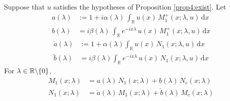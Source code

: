 \documentclass[../dissertation.tex]{subfiles}
\begin{document}
\begin{prop}\label{prop4:SD}
	Suppose that $u$ satisfies the hypotheses of Proposition \ref{prop4:exist}.
	Let
	\begin{subequations}
		\label{eq4:SD}
		\begin{align}
			a(\lambda)
				&:= 1 + i \alpha(\lambda) \,
					\int_{\mathbb R} u(x) \, M_1^+(x; \lambda, u) \, \mathrm{d}x \\
			b(\lambda)
				&= i \beta(\lambda) \, 
					\int_{\mathbb R} e^{-ix\lambda} \, u(x) \, M_1^+(x; \lambda, u) \, \mathrm{d}x
		\end{align}
	\end{subequations}
	\vspace{-\baselineskip}
	\begin{subequations}
		\label{eq4:SDbrev}
		\begin{align}
			\breve{a}(\lambda)
				&:= 1 + \alpha(\lambda)
					\int_{\mathbb R} u(x) \, N_1(x; \lambda, u) \, \mathrm{d}x \\
			\breve{b}(\lambda)
				&= i \beta(\lambda) 
					\int_{\mathbb R} e^{-ix\lambda} \, u(x) \, N_1(x; \lambda, u) \, \mathrm{d}x
		\end{align}
	\end{subequations}
	For $\lambda \in \mathbb R \backslash \{0\}$, 
	\begin{align}
		M_1 (x; \lambda)
			&= a(\lambda) \, N_1(x; \lambda) + b(\lambda) \, N_e(x; \lambda) 
			\label{eq3:M1N} \\
		N_1 (x; \lambda)
			&= \breve{a}(\lambda) \, M_1(x; \lambda) 
				+ \breve{b}(\lambda) \, M_e(x; \lambda)
			\label{eq3:N1M}
	\end{align}
\end{prop}
\end{document}
